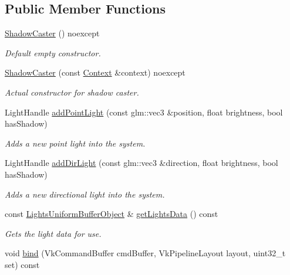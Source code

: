 \subsection*{Public Member Functions}
\begin{DoxyCompactItemize}
\item 
\mbox{\label{classblaze_1_1ShadowCaster_ac3b183905c0a44705840eb075bbf9d07}} 
\hyperlink{classblaze_1_1ShadowCaster_ac3b183905c0a44705840eb075bbf9d07}{Shadow\+Caster} () noexcept
\begin{DoxyCompactList}\small\item\em Default empty constructor. \end{DoxyCompactList}\item 
\hyperlink{classblaze_1_1ShadowCaster_a56725d8747bed3ddabde77979896194d}{Shadow\+Caster} (const \hyperlink{classblaze_1_1Context}{Context} \&context) noexcept
\begin{DoxyCompactList}\small\item\em Actual constructor for shadow caster. \end{DoxyCompactList}\item 
Light\+Handle \hyperlink{classblaze_1_1ShadowCaster_a4692f3db878f51b845402b73e1d9977c}{add\+Point\+Light} (const glm\+::vec3 \&position, float brightness, bool has\+Shadow)
\begin{DoxyCompactList}\small\item\em Adds a new point light into the system. \end{DoxyCompactList}\item 
Light\+Handle \hyperlink{classblaze_1_1ShadowCaster_a6fbd4e556adbba12e81017b16992cade}{add\+Dir\+Light} (const glm\+::vec3 \&direction, float brightness, bool has\+Shadow)
\begin{DoxyCompactList}\small\item\em Adds a new directional light into the system. \end{DoxyCompactList}\item 
const \hyperlink{structblaze_1_1LightsUniformBufferObject}{Lights\+Uniform\+Buffer\+Object} \& \hyperlink{classblaze_1_1ShadowCaster_aecb1af61dfeffe1a44a87b7f4aeeca98}{get\+Lights\+Data} () const
\begin{DoxyCompactList}\small\item\em Get\textquotesingle{}s the light data for use. \end{DoxyCompactList}\item 
void \hyperlink{classblaze_1_1ShadowCaster_ab32615d2370764b844c467215a93e78b}{bind} (Vk\+Command\+Buffer cmd\+Buffer, Vk\+Pipeline\+Layout layout, uint32\+\_\+t set) const

\end{DoxyCompactItemize}
